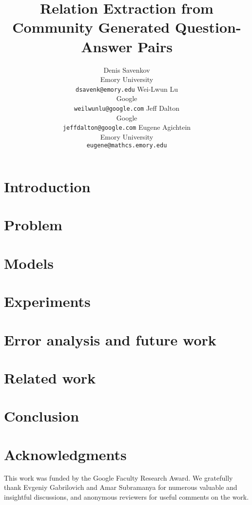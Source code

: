 \documentclass[11pt,letterpaper]{article}
\title{Relation Extraction from Community Generated Question-Answer Pairs}
\author{
Denis Savenkov\\
Emory University\\ %
{\tt dsavenk@emory.edu}
\And
Wei-Lwun Lu\\
Google\\
{\tt weilwunlu@google.com}
\AND
Jeff Dalton\\
Google\\
{\tt jeffdalton@google.com}
\And
Eugene Agichtein\\
Emory University\\
{\tt eugene@mathcs.emory.edu}}
\date{}
\begin{document}
\maketitle

\begin{abstract}

\end{abstract}

\section{Introduction}
\label{sec:intro}


\section{Problem}
\label{sec:problem}


\section{Models}
\label{sec:model}


\section{Experiments}
\label{sec:experiments}


\section{Error analysis and future work}
\label{sec:analysis}


\section{Related work}
\label{sec:relatedwork}


\section{Conclusion}
\label{sec:conclusion}


\vspace{-1mm}
\section*{Acknowledgments}
\vspace{-1mm}
This work was funded by the Google Faculty Research Award.
We gratefully thank Evgeniy Gabrilovich and Amar Subramanya for numerous valuable and insightful discussions, and anonymous reviewers for useful comments on the work.



\end{document}
